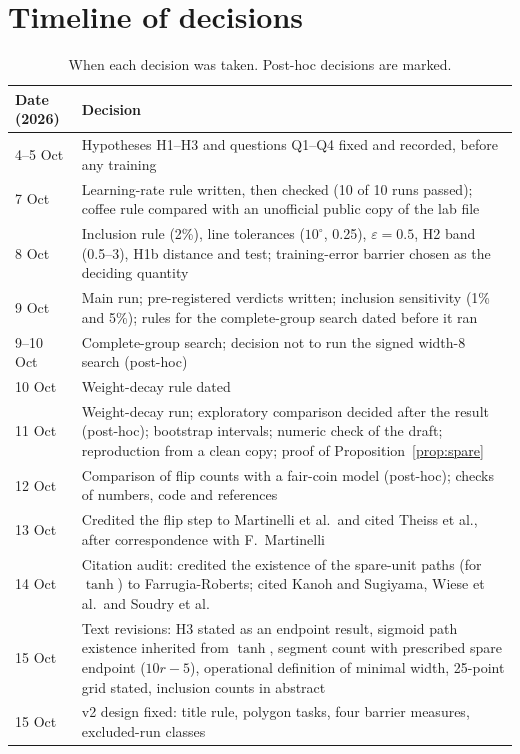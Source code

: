 \documentclass[11pt]{article}
\newcommand{\eps}{\varepsilon}
\begin{document}
\section{Timeline of decisions}
\label{app:timeline}

\begin{table}[H]
\centering
\small
\caption{When each decision was taken. Post-hoc decisions are marked.}
\begin{tabularx}{\linewidth}{@{}lX@{}}
\toprule
Date (2026) & Decision \\
\midrule
4--5 Oct & Hypotheses H1--H3 and questions Q1--Q4 fixed and recorded, before any training \\
7 Oct & Learning-rate rule written, then checked (10 of 10 runs passed); coffee rule compared with an unofficial public copy of the lab file \\
8 Oct & Inclusion rule (2\%), line tolerances ($10^\circ$, 0.25), $\eps = 0.5$, H2 band (0.5--3), H1b distance and test; training-error barrier chosen as the deciding quantity \\
9 Oct & Main run; pre-registered verdicts written; inclusion sensitivity (1\% and 5\%); rules for the complete-group search dated before it ran \\
9--10 Oct & Complete-group search; decision not to run the signed width-8 search (post-hoc) \\
10 Oct & Weight-decay rule dated \\
11 Oct & Weight-decay run; exploratory comparison decided after the result (post-hoc); bootstrap intervals; numeric check of the draft; reproduction from a clean copy; proof of Proposition~\ref{prop:spare} \\
12 Oct & Comparison of flip counts with a fair-coin model (post-hoc); checks of numbers, code and references \\
13 Oct & Credited the flip step to Martinelli et al.\ and cited Theiss et al., after correspondence with F.~Martinelli \\
14 Oct & Citation audit: credited the existence of the spare-unit paths (for $\tanh$) to Farrugia-Roberts; cited Kanoh and Sugiyama, Wiese et al.\ and Soudry et al. \\
15 Oct & Text revisions: H3 stated as an endpoint result, sigmoid path existence inherited from $\tanh$, segment count with prescribed spare endpoint ($10r-5$), operational definition of minimal width, 25-point grid stated, inclusion counts in abstract \\
15 Oct & v2 design fixed: title rule, polygon tasks, four barrier measures, excluded-run classes \\

\end{tabularx}
\end{table}
\end{document}
